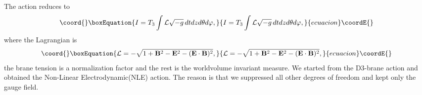 \documentclass[a4paper,12pt]{article}
\begin{document}
\noindent
The action reduces to
\begin{equation}\coord{}\boxEquation{
I=T_3\int {\cal L}\sqrt{-g}\,dtdzd\theta d\varphi,
\label{bi5}
}{
I=T_3\int {\cal L}\sqrt{-g}\,dtdzd\theta d\varphi,
}{ecuacion}\coordE{}\end{equation}
where the Lagrangian \coordHE{} is
\begin{equation}\coord{}\boxEquation{
{\cal L}=-\sqrt{1+{\m}^2-{\e}^2-(\e \cdot \m)^2},
\label{bi6}
}{
{\cal L}=-\sqrt{1+{\m}^2-{\e}^2-(\e \cdot \m)^2},
}{ecuacion}\coordE{}\end{equation}
the brane tension is a normalization factor and the rest is the worldvolume 
invariant measure. We started from the D3-brane
action and obtained the Non-Linear Electrodynamic(NLE) action. The reason is 
that we suppressed all other degrees of freedom and kept only the gauge field.
\end{document}
